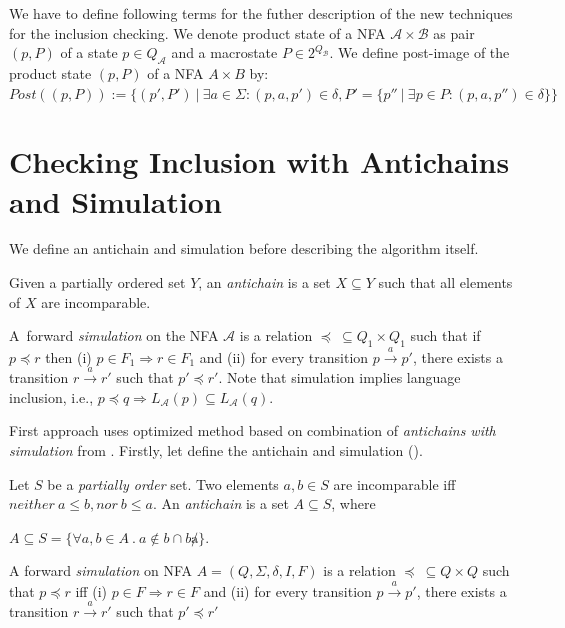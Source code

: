 We have to define following terms for the futher description of the new techniques for the inclusion checking.
We denote product state of a NFA $\mathcal{A} \times \mathcal{B}$ as pair $(p,P)$ of a state $p\in Q_\mathcal{A}$ and a macrostate $P \in 2^{Q_\mathcal{B}}$.
We define post-image of the product state $(p,P)$ of a NFA $A\times B$ by:\
$Post((p,P)):=\{(p',P')\ |\ \exists a \in \Sigma: (p,a,p')\in \delta, P'=\{p''\ |\ \exists p \in P:(p,a,p'')\in \delta\}\}$

\section{Checking Inclusion with Antichains and Simulation}
We define an antichain and simulation before describing the algorithm itself.

Given a partially ordered set $Y$, an \emph {antichain} is a set $X \subseteq Y$ such that all elements of $X$ are incomparable.

A~forward \emph{simulation} on the NFA $\mathcal{A}$ is a relation $\preceq\  \subseteq Q_1 \times Q_1$ 
such that if $p \preceq r$ then (i) $p \in F_1 
\Rightarrow r \in F_1$ and (ii) for every transition $p\xrightarrow{a}p'$, there exists a transition 
$r\xrightarrow{a}r'$ such that $p' \preceq r'$. Note that simulation implies language inclusion, i.e., $p\preceq q \Rightarrow L_\mathcal{A}(p)
\subseteq L_\mathcal{A}(q)$.


First approach uses optimized method based on combination of \emph{antichains with simulation} from \cite{tacas10}.
Firstly, let define the antichain and simulation (\cite{simulations}).
\begin{definition}
\label{defAntichains}
	Let $S$ be a \emph{partially order} set. Two elements $a,b\in S$ are incomparable iff $neither\ a \leq b, nor\ b \leq a$.
	An \emph{antichain} is a set $A \subseteq S$, where
	\begin{description}	
		\item $A \subseteq S =\{\forall a,b \in A\ .\ a\not\in b \cap b \not a\}$. 
	\end{description}	
\end{definition}
\begin{definition}
\label{defSimulation}
		A forward \emph{simulation} on NFA $A=(Q,\Sigma,\delta,I,F)$ is a relation $\preceq\  \subseteq Q \times Q$ such that $p \preceq r$ iff (i) $p \in F 
		\Rightarrow r \in F$ and (ii) for every transition $p \xrightarrow{a} p'$, there exists a transition $r \xrightarrow{a} r'$ such that $p' \preceq r'$ 
\end{definition}

